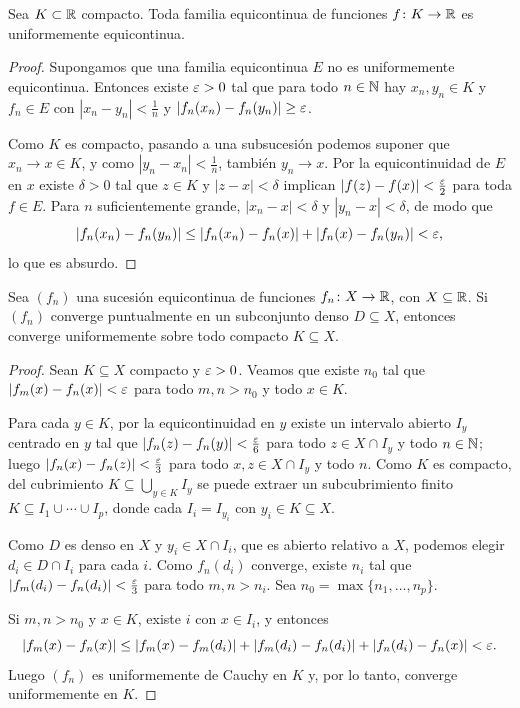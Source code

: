 \begin{theorem}
  Sea \(K \subset \mathbb{R}\) compacto. Toda familia equicontinua de funciones \(f\colon K \to \mathbb{R}\) es uniformemente equicontinua.
\end{theorem}

\begin{proof}
  Supongamos que una familia equicontinua \(E\) no es uniformemente equicontinua. Entonces existe \(\varepsilon > 0\) tal que para todo \(n \in \mathbb{N}\) hay \(x_n, y_n \in K\) y \(f_n \in E\) con \(|x_n - y_n| < \frac{1}{n}\) y \(|f_n(x_n) - f_n(y_n)| \geq \varepsilon\).

  Como \(K\) es compacto, pasando a una subsucesión podemos suponer que \(x_n \to x \in K\), y como \(|y_n - x_n| < \frac{1}{n}\), también \(y_n \to x\). Por la equicontinuidad de \(E\) en \(x\) existe \(\delta > 0\) tal que \(z \in K\) y \(|z - x| < \delta\) implican \(|f(z) - f(x)| < \frac{\varepsilon}{2}\) para toda \(f \in E\). Para \(n\) suficientemente grande, \(|x_n - x| < \delta\) y \(|y_n - x| < \delta\), de modo que
  \[
    |f_n(x_n) - f_n(y_n)| \leq |f_n(x_n) - f_n(x)| + |f_n(x) - f_n(y_n)| < \varepsilon,
  \]
  lo que es absurdo.
\end{proof}

\begin{theorem}
  Sea \({(f_n)}\) una sucesión equicontinua de funciones \(f_n\colon X \to \mathbb{R}\), con \(X \subseteq \mathbb{R}\). Si \({(f_n)}\) converge puntualmente en un subconjunto denso \(D \subseteq X\), entonces converge uniformemente sobre todo compacto \(K \subseteq X\).
\end{theorem}

\begin{proof}
  Sean \(K \subseteq X\) compacto y \(\varepsilon > 0\). Veamos que existe \(n_0\) tal que \(|f_m(x) - f_n(x)| < \varepsilon\) para todo \(m, n > n_0\) y todo \(x \in K\).

  Para cada \(y \in K\), por la equicontinuidad en \(y\) existe un intervalo abierto \(I_y\) centrado en \(y\) tal que \(|f_n(z) - f_n(y)| < \frac{\varepsilon}{6}\) para todo \(z \in X \cap I_y\) y todo \(n \in \mathbb{N}\); luego \(|f_n(x) - f_n(z)| < \frac{\varepsilon}{3}\) para todo \(x, z \in X \cap I_y\) y todo \(n\). Como \(K\) es compacto, del cubrimiento \(K \subseteq \bigcup_{y \in K} I_y\) se puede extraer un subcubrimiento finito \(K \subseteq I_1 \cup \cdots \cup I_p\), donde cada \(I_i = I_{y_i}\) con \(y_i \in K \subseteq X\).

  Como \(D\) es denso en \(X\) y \(y_i \in X \cap I_i\), que es abierto relativo a \(X\), podemos elegir \(d_i \in D \cap I_i\) para cada \(i\). Como \(f_n(d_i)\) converge, existe \(n_i\) tal que \(|f_m(d_i) - f_n(d_i)| < \frac{\varepsilon}{3}\) para todo \(m, n > n_i\). Sea \(n_0 = \max\{n_1, \dots, n_p\}\).

  Si \(m, n > n_0\) y \(x \in K\), existe \(i\) con \(x \in I_i\), y entonces
  \[
    |f_m(x) - f_n(x)| \leq |f_m(x) - f_m(d_i)| + |f_m(d_i) - f_n(d_i)| + |f_n(d_i) - f_n(x)| < \varepsilon.
  \]
  Luego \({(f_n)}\) es uniformemente de Cauchy en \(K\) y, por lo tanto, converge uniformemente en \(K\).
\end{proof}

